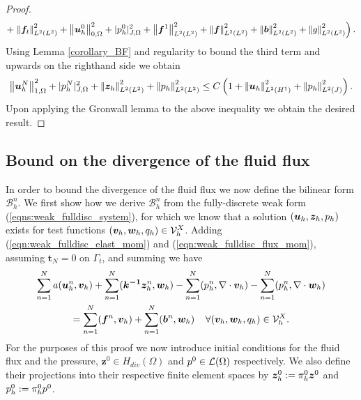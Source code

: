\begin{proof}
\begin{multline*}
   + \left. {\left\vert\kern-0.25ex\left\vert {\boldsymbol{f}}_{t} \right\vert\kern-0.25ex\right\vert}_{L^{2}(L^{2})}^{2} + {\left\vert\kern-0.25ex\left\vert \boldsymbol{u}_{h}^{0} \right\vert\kern-0.25ex\right\vert}_{0,\Omega}^{2} + |{p_h^{0}}|_{J,\Omega}^{2}  + {\left\vert\kern-0.25ex\left\vert {\boldsymbol{f}^{1}} \right\vert\kern-0.25ex\right\vert}_{L^{2}(L^{2})}^{2}  +{\left\vert\kern-0.25ex\left\vert {\boldsymbol{f}} \right\vert\kern-0.25ex\right\vert}_{L^{2}(L^{2})}^{2} +  {\left\vert\kern-0.25ex\left\vert {\boldsymbol{b}} \right\vert\kern-0.25ex\right\vert}_{L^{2}(L^{2})}^{2}   + {\left\vert\kern-0.25ex\left\vert g \right\vert\kern-0.25ex\right\vert}_{L^{2}(L^{2})}^{2} \right) .
\end{multline*}
Using Lemma \ref{corollary_BF} and regularity to bound the third term and upwards on the righthand side we obtain \
\begin{equation*}
{\left\vert\kern-0.25ex\left\vert \boldsymbol{u}_{h}^{N} \right\vert\kern-0.25ex\right\vert}_{1,\Omega}^{2} + |{p_h^{N}}|_{J,\Omega}^{2}  +  {\left\vert\kern-0.25ex\left\vert \boldsymbol{z}_{h} \right\vert\kern-0.25ex\right\vert}_{L^{2}(L^{2})}^{2} + {\left\vert\kern-0.25ex\left\vert p_h \right\vert\kern-0.25ex\right\vert}_{L^{2}(L^{2})}^{2}  \leq   C \left( 1 + {\left\vert\kern-0.25ex\left\vert \boldsymbol{u}_{h} \right\vert\kern-0.25ex\right\vert}_{L^{2}(H^{1})}^{2} +  {\left\vert\kern-0.25ex\left\vert p_h \right\vert\kern-0.25ex\right\vert}_{L^{2}(J)}^2 \right) .
\end{equation*}
Upon applying the Gronwall lemma to the above inequality we obtain the desired result.


\end{proof}




\subsection{Bound on the divergence of the fluid flux}
\label{sec:linear_form_two}

In order to bound the divergence of the fluid flux we now define the bilinear form $\mathcal{B}_{h}^{n}$. We first show how we derive $\mathcal{B}_{h}^{n}$ from the fully-discrete weak form (\ref{eqns:weak_fulldisc_system}), for which we know that a solution $(\boldsymbol{u}_{h},\boldsymbol{z}_{h},p_h)$ exists for test functions $(\boldsymbol{v}_{h},\boldsymbol{w}_{h},{q}_{h}) \in \mathcal{V}^{X}_{h}$.
Adding (\ref{eqn:weak_fulldisc_elast_mom}) and (\ref{eqn:weak_fulldisc_flux_mom}), assuming
$\mathbf{t}_{N}=0$ on $\Gamma_{t}$, and summing we have
\begin{multline}
 \sum_{n=1}^{N}    a(\boldsymbol{u}_{h}^{n},\boldsymbol{v}_{h})+ \sum_{n=1}^{N}   (\boldsymbol{k^{-1}} \boldsymbol{z}_{h}^{n}, \boldsymbol{w}_{h})    - \sum_{n=1}^{N}   (p_h^{n}, \nabla \cdot \boldsymbol{v}_{h})    - \sum_{n=1}^{N}   (p_h^{n}, \nabla \cdot \boldsymbol{w}_{h})    \\ =
\sum_{n=1}^{N}   (\boldsymbol{f}^{n},\boldsymbol{v}_{h})  + \sum_{n=1}^{N}   (\boldsymbol{b}^{n},\boldsymbol{w}_{h}) \;\;    \;\; \forall (\boldsymbol{v}_{h},\boldsymbol{w}_{h},{q}_{h}) \in \mathcal{V}^{X}_{h}.
\label{eqn:Bstar1}
\end{multline}
For the purposes of this proof we now introduce initial conditions for the fluid flux and the pressure, $\mathbf{z}^{0}  \in  H_{div}(\Omega)$ and $p^0 \in \mathcal{L}(\Omega)$ respectively. We also define their projections into their respective finite element spaces by  $\boldsymbol{z}^{0}_h := \pi_{h}^{0} \boldsymbol{z}^{0}$ and $p^0_h := \pi_{h}^{0} p^0$.

